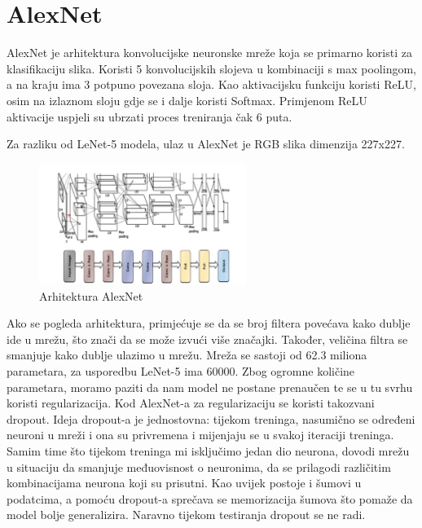 \section{AlexNet}\label{sec:alexnet}
AlexNet je arhitektura konvolucijske neuronske mreže koja se primarno koristi za klasifikaciju slika. Koristi 5 konvolucijskih slojeva u kombinaciji s max poolingom, a na kraju ima 3 potpuno povezana sloja. Kao aktivacijsku funkciju koristi ReLU, osim na izlaznom sloju gdje se i dalje koristi Softmax. Primjenom ReLU aktivacije uspjeli su ubrzati proces treniranja čak 6 puta.

Za razliku od LeNet-5 modela, ulaz u AlexNet je RGB slika dimenzija 227x227.
\FloatBarrier
\begin{figure}[h]
    \centering
    \includegraphics[width=0.6\textwidth]{images/AlexNet}
    \caption{Arhitektura AlexNet
    \protect\footnotemark}
    \label{fig:slika9}
\end{figure}
\FloatBarrier
{}


Ako se pogleda arhitektura, primjećuje se da se broj filtera povećava kako dublje ide u mrežu, što znači da se može izvući više značajki.
Također, veličina filtra se smanjuje kako dublje ulazimo u mrežu.
Mreža se sastoji od 62.3 miliona parametara, za usporedbu LeNet-5 ima 60000.
Zbog ogromne količine parametara, moramo paziti da nam model ne postane prenaučen te se u tu svrhu koristi regularizacija.
Kod AlexNet-a za regularizaciju se koristi takozvani dropout.
Ideja dropout-a je jednostovna: tijekom treninga, nasumično se  određeni neuroni u mreži i ona su privremena i mijenjaju se u svakoj iteraciji treninga.
Samim time što tijekom treninga mi isključimo jedan dio neurona, dovodi mrežu u situaciju da smanjuje međuovisnost o neuronima, da se prilagodi različitim kombinacijama neurona koji su prisutni.
Kao uvijek postoje i šumovi u podatcima, a pomoću dropout-a sprečava se memorizacija šumova što pomaže da model bolje generalizira.
Naravno tijekom testiranja dropout se ne radi.

